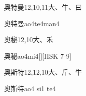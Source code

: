 \begin{Entry}{奥特曼}{12,10,11}{⼤、⽜、⽈}
  \begin{Phonetics}{奥特曼}{ao4te4man4}
  \end{Phonetics}
\end{Entry}

\begin{Entry}{奥秘}{12,10}{⼤、⽲}
  \begin{Phonetics}{奥秘}{ao4mi4}[][HSK 7-9]
  \end{Phonetics}
\end{Entry}

\begin{Entry}{奥斯特}{12,12,10}{⼤、⽄、⽜}
  \begin{Phonetics}{奥斯特}{ao4 si1 te4}
  \end{Phonetics}
\end{Entry}


